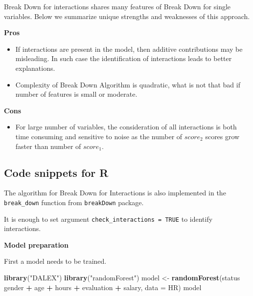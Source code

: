 \documentclass[]{krantz}
\newenvironment{Shaded}{\begin{snugshade}}{\end{snugshade}}
\newcommand{\DataTypeTok}[1]{\textcolor[rgb]{0.13,0.29,0.53}{#1}}
\newcommand{\KeywordTok}[1]{\textcolor[rgb]{0.13,0.29,0.53}{\textbf{#1}}}
\newcommand{\NormalTok}[1]{#1}
\newcommand{\OperatorTok}[1]{\textcolor[rgb]{0.81,0.36,0.00}{\textbf{#1}}}
\newcommand{\StringTok}[1]{\textcolor[rgb]{0.31,0.60,0.02}{#1}}
\providecommand{\tightlist}{%
  \setlength{\itemsep}{0pt}\setlength{\parskip}{0pt}}
\theoremstyle{definition}
\theoremstyle{definition}
\theoremstyle{definition}
\theoremstyle{remark}
\begin{document}
Break Down for interactions shares many features of Break Down for
single variables. Below we summarize unique strengths and weaknesses of
this approach.

\textbf{Pros}

\begin{itemize}
\tightlist
\item
  If interactions are present in the model, then additive contributions
  may be misleading. In such case the identification of interactions
  leads to better explanations.
\item
  Complexity of Break Down Algorithm is quadratic, what is not that bad
  if number of features is small or moderate.
\end{itemize}

\textbf{Cons}

\begin{itemize}
\tightlist
\item
  For large number of variables, the consideration of all interactions
  is both time consuming and sensitive to noise as the number of
  \(score_2\) scores grow faster than number of \(score_1\).
\end{itemize}

\hypertarget{code-snippets-for-r-1}{%
\subsection{Code snippets for R}\label{code-snippets-for-r-1}}

The algorithm for Break Down for Interactions is also implemented in the
\texttt{break\_down} function from \texttt{breakDown} package.

It is enough to set argument \texttt{check\_interactions\ =\ TRUE} to
identify interactions.

\textbf{Model preparation}

First a model needs to be trained.

\begin{Shaded}
\begin{Highlighting}[]
\KeywordTok{library}\NormalTok{(}\StringTok{"DALEX"}\NormalTok{)}
\KeywordTok{library}\NormalTok{(}\StringTok{"randomForest"}\NormalTok{)}
\NormalTok{model <-}\StringTok{ }\KeywordTok{randomForest}\NormalTok{(status }\OperatorTok{~}\StringTok{ }\NormalTok{gender }\OperatorTok{+}\StringTok{ }\NormalTok{age }\OperatorTok{+}\StringTok{ }\NormalTok{hours }\OperatorTok{+}\StringTok{ }\NormalTok{evaluation }\OperatorTok{+}\StringTok{ }\NormalTok{salary, }\DataTypeTok{data =}\NormalTok{ HR)}
\NormalTok{model}
\end{Highlighting}
\end{Shaded}
\end{document}
